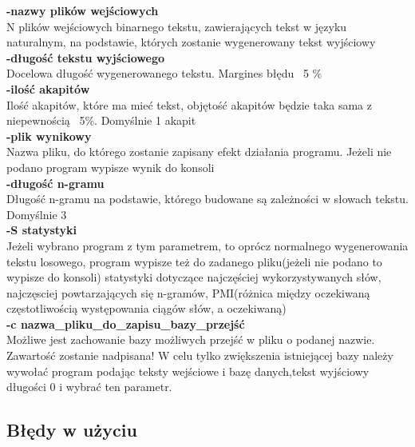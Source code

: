 \documentclass{article}
\begin{document}
		\textbf{-nazwy plików wejściowych}\\
		
		    N plików wejściowych binarnego tekstu, zawierających tekst w języku naturalnym, na podstawie, których zostanie wygenerowany tekst wyjściowy\\
		
		\textbf{-długość tekstu wyjściowego}\\
		
			Docelowa długość wygenerowanego tekstu. Margines błędu ~5 \%\\
		
		\textbf{-ilość akapitów}\\
		
			Ilość akapitów, które ma mieć tekst, objętość akapitów będzie taka sama z niepewnością ~5\%. Domyślnie 1 akapit\\
		
		\textbf{-plik wynikowy} \\
		
			Nazwa pliku, do którego zostanie zapisany efekt działania programu. Jeżeli nie podano program wypisze wynik do konsoli\\
		
		\textbf{-długość n-gramu}\\
		
			Długość n-gramu na podstawie, którego budowane są zależności w słowach tekstu. Domyślnie 3\\
			
		\textbf{-S statystyki}\\
		
			Jeżeli wybrano program z tym parametrem, to oprócz normalnego wygenerowania tekstu losowego, program wypisze też do zadanego pliku(jeżeli nie podano to wypisze do konsoli) statystyki dotyczące najczęściej wykorzystywanych słów, najczęsciej powtarzających się n-gramów, PMI(różnica między oczekiwaną częstotliwością występowania ciągów słów, a oczekiwaną) \\
			
			\textbf{-c nazwa\_pliku\_do\_zapisu\_bazy\_przejść}\\
			
			Możliwe jest zachowanie bazy możliwych przejść w pliku o podanej nazwie. Zawartość zostanie nadpisana! W celu tylko zwiększenia istniejącej bazy należy wywołać program podając teksty wejściowe i bazę danych,tekst wyjściowy długości 0 i wybrać ten parametr. 
			

\subsection*{Błędy w użyciu}
\end{document}
